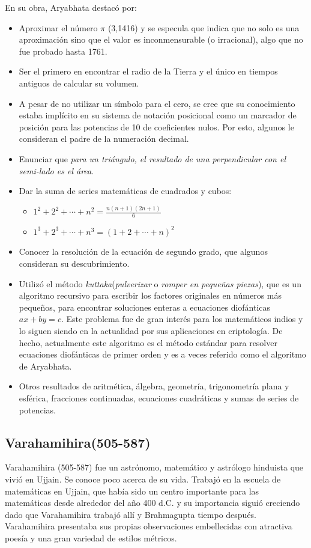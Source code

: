 \documentclass[a4paper, 11pt]{article}
\begin{document}
		En su obra, Aryabhata destacó por:
		\begin{itemize}
			\item Aproximar el número $\pi$ (3,1416) y se especula que indica que no solo es una aproximación sino
			que el valor es inconmensurable (o irracional), algo que no fue probado hasta 1761.
			\item Ser el primero en encontrar el radio de la Tierra y el único en tiempos antiguos de calcular su
			volumen.
			\item A pesar de no utilizar un símbolo para el cero, se cree que su conocimiento estaba implícito en su
			sistema de notación posicional como un marcador de posición para las potencias de 10 de coeficientes nulos.
			Por esto, algunos le consideran el padre de la numeración decimal.					
			\item Enunciar que \textit{para un triángulo, el resultado de una perpendicular con el semi-lado es el área}.
			\item Dar la suma de series matemáticas de cuadrados y cubos:
			\begin{itemize}
				\item $\displaystyle 1^2 + 2^2 + \cdots + n^2 = \frac{n(n + 1)(2n + 1)}{6}$
				\item $\displaystyle 1^{3} + 2^{3} + \cdots + n^{3} = (1+2+\cdots +n)^{2}$ 
			\end{itemize}
			\item Conocer la resolución de la ecuación de segundo grado, que algunos consideran su descubrimiento.
			\item Utilizó el método \textit{kuttaka}(\textit{pulverizar} o \textit{romper en pequeñas piezas}), que es
			un algoritmo recursivo para escribir los factores originales en números más pequeños, para encontrar
			soluciones enteras a ecuaciones diofánticas $ax + by = c$. Este problema fue de gran interés para los
			matemáticos indios y lo siguen siendo en la actualidad por sus aplicaciones en criptología. De hecho,
			actualmente este algoritmo es el método estándar para resolver ecuaciones diofánticas de primer orden y es
			a veces referido como el algoritmo de Aryabhata.
			\item Otros resultados de aritmética, álgebra, geometría, trigonometría plana y esférica, fracciones
			continuadas, ecuaciones cuadráticas y sumas de series de potencias.
		\end{itemize} 		

	\subsection{Varahamihira(505-587)}
		Varahamihira (505-587) fue un astrónomo, matemático y astrólogo hinduista que vivió en Ujjain. Se conoce poco
		acerca de su vida. Trabajó en la escuela de matemáticas en Ujjain, que había sido un centro importante para
		las matemáticas desde alrededor del año 400 d.C. y su importancia siguió creciendo dado que Varahamihira trabajó
		allí y Brahmagupta tiempo después. Varahamihira presentaba sus propias observaciones embellecidas con atractiva
		poesía y una gran variedad de estilos métricos.
		
\end{document}
